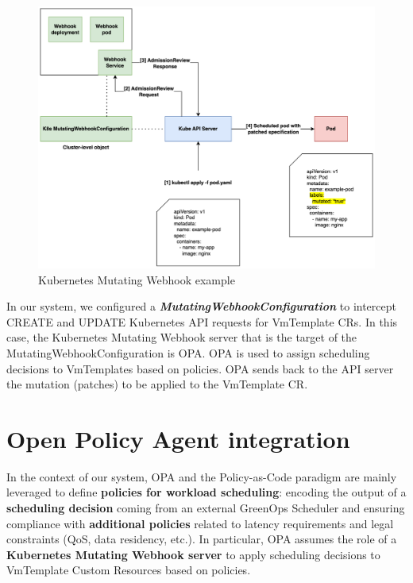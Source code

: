 \begin{figure}[t]
  \centering
  \includegraphics[width=1\linewidth]{images/k8s_webhook_example.png}
  \caption{Kubernetes Mutating Webhook example \cite{kubernetes_mutating_webhook_example}}
  \label{fig:k8s_webhook_example}
\end{figure}

In our system, we configured a \textbf{\textit{MutatingWebhookConfiguration}} to intercept CREATE and UPDATE Kubernetes API requests for VmTemplate CRs.
In this case, the Kubernetes Mutating Webhook server that is the target of the MutatingWebhookConfiguration is OPA.
OPA is used to assign scheduling decisions to VmTemplates based on policies. 
OPA sends back to the API server the mutation (patches) to be applied to the VmTemplate CR.

\section{Open Policy Agent integration}

In the context of our system, OPA and the Policy-as-Code paradigm are mainly leveraged to define \textbf{policies for workload scheduling}: encoding the output of a \textbf{scheduling decision} coming from an external GreenOps Scheduler and ensuring compliance with \textbf{additional policies} related to latency requirements and legal constraints (QoS, data residency, etc.).
In particular, OPA assumes the role of a \textbf{Kubernetes Mutating Webhook server} to apply scheduling decisions to VmTemplate Custom Resources based on policies.


